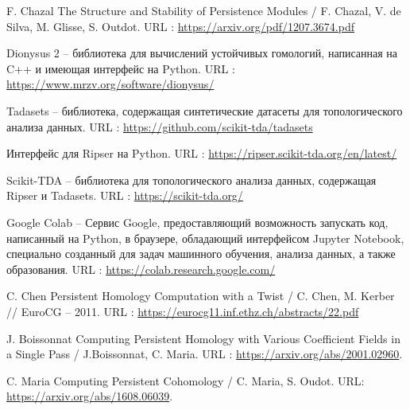 \begin{thebibliography}{99}
	F. Chazal The Structure and Stability of Persistence Modules / F. Chazal, V. de Silva, M. Glisse, S. Outdot. URL : \url{https://arxiv.org/pdf/1207.3674.pdf}
	
	Dionysus 2 -- библиотека для вычислений устойчивых гомологий, написанная на C++ и имеющая интерфейс на Python. URL : \url{https://www.mrzv.org/software/dionysus/}
	
	Tadasets -- библиотека, содержащая синтетические датасеты для топологического анализа данных. URL : \url{https://github.com/scikit-tda/tadasets}
	
	Интерфейс для Ripser на Python. URL : \url{https://ripser.scikit-tda.org/en/latest/}
	
	Scikit-TDA -- библиотека для топологического анализа данных, содержащая Ripser и Tadasets. URL : \url{https://scikit-tda.org/}
	
	Google Colab -- Сервис Google, предоставляющий возможность запускать код, написанный на Python, в браузере, обладающий интерфейсом Jupyter Notebook, специально созданный для задач машинного обучения, анализа данных, а также образования. URL : \url{https://colab.research.google.com/}
	
	C. Chen Persistent Homology Computation with a Twist / C. Chen, M. Kerber // EuroCG -- 2011. URL : \url{https://eurocg11.inf.ethz.ch/abstracts/22.pdf}
	
	J. Boissonnat Computing Persistent Homology with Various Coefficient Fields in a Single Pass / J.Boissonnat, C. Maria. URL : \url{https://arxiv.org/abs/2001.02960}.
	
	C. Maria Computing Persistent Cohomology / C. Maria, S. Oudot. URL: \url{https://arxiv.org/abs/1608.06039}.
	
\end{thebibliography}